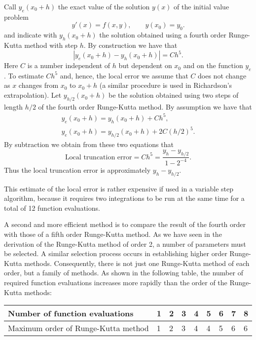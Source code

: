 Call $y_e(x_0+h)$ the exact value of the solution $y(x)$ of the
initial value problem
%
\begin{equation}
  y'(x) = f(x,y) , \qquad y(x_0) = y_0 .
\end{equation}
%
and indicate with $y_h(x_0+h)$ the solution obtained using a fourth
order Runge-Kutta method with step $h$.  By construction we have that
% 
\begin{equation}
  |y_e(x_0+h) - y_h(x_0+h)| = C h^5.
  \label{IVP.eq:41}
\end{equation}
% 
Here $C$ is a number independent of $h$ but dependent on $x_0$ and on
the function $y_e$.  To estimate $C h^5$ and, hence, the local error
we assume that $C$ does not change as $x$ changes from $x_0$ to $x_0 +
h$ (a similar procedure is used in Richardson's extrapolation).  Let
$y_{h/2}(x_0+h)$ be the solution obtained using two steps of length
$h/2$ of the fourth order Runge-Kutta method.  By assumption we have
that
%
\begin{equation}
  \begin{array}{l}
    y_e(x_0+h) = y_{h}(x_0+h) + C h^5 , \\
    y_e(x_0+h) = y_{h/2}(x_0+h) + 2 C (h/2)^5 . 
  \end{array}
  \label{IVP.eq:42}
\end{equation}
% 
By subtraction we obtain from these two equations that
% 
\begin{equation}
  \text{Local truncation error} = C h^5 = 
  \frac{y_h - y_{h/2}}{1-2^{-4}} .
  \label{IVP.eq:43}
\end{equation}
%
Thus the local truncation error is approximately $y_h - y_{h/2}$.

This estimate of the local error is rather expensive if used in a
variable step algorithm, because it requires two integrations to be
run at the same time for a total of 12 function evaluations.
  
A second and more efficient method is to compare the result of the
fourth order with those of a fifth order Runge-Kutta method.  As we
have seen in the derivation of the Runge-Kutta method of order 2, a
number of parameters must be selected.  A similar selection process
occurs in establishing higher order Runge-Kutta methods.
Consequently, there is not just one Runge-Kutta method of each order,
but a family of methods.  As shown in the following table, the number
of required function evaluations increases more rapidly than the order
of the Runge-Kutta methods:

\begin{center}
  \begin{tabular}{l|llllllll}
    Number of function evaluations & 1 & 2 & 3 & 4 & 5 & 6 & 7 & 8 \\ \hline
    Maximum order of Runge-Kutta method & 1 & 2 & 3 & 4 & 4 & 5 & 6 & 6
  \end{tabular} 
\end{center}

